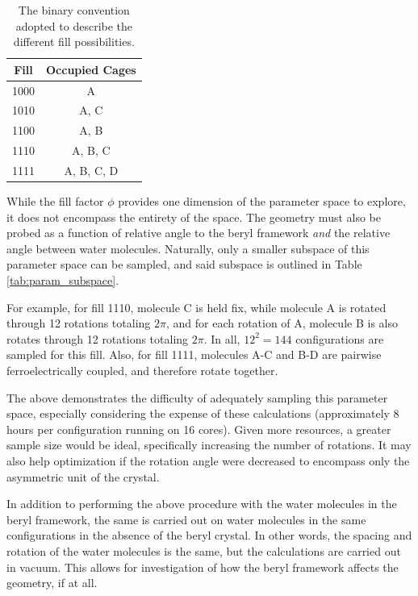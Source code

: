         \begin{table}[]
            \centering
            \begin{tabular}{c|c}
               Fill  & Occupied Cages \\
               \hline
               \hline
               1000  &  A \\
               1010  &  A, C \\
               1100  &  A, B \\
               1110  &  A, B, C \\
               1111  &  A, B, C, D\\
            \end{tabular}
            \caption{The binary convention adopted to describe the different fill possibilities.}
            \label{tab:fill_conventions}
        \end{table}
        
        While the fill factor $\phi$ provides one dimension of the parameter space to explore, it does not encompass the entirety of the space. The geometry must also be probed as a function of relative angle to the beryl framework \textit{and} the relative angle between water molecules. Naturally, only a smaller subspace of this parameter space can be sampled, and said subspace is outlined in Table \ref{tab:param_subspace}.
        
        For example, for fill 1110, molecule C is held fix, while molecule A is rotated through 12 rotations totaling $2\pi$, and for each rotation of A, molecule B is also rotates through 12 rotations totaling $2\pi$. In all, $12^2 = 144$ configurations are sampled for this fill. Also, for fill 1111, molecules A-C and B-D are pairwise ferroelectrically coupled, and therefore rotate together. 
        
        The above demonstrates the difficulty of adequately sampling this parameter space, especially considering the expense of these calculations (approximately 8 hours per configuration running on 16 cores). Given more resources, a greater sample size would be ideal, specifically increasing the number of rotations. It may also help optimization if the rotation angle were decreased to encompass only the asymmetric unit of the crystal.
        
        In addition to performing the above procedure with the water molecules in the beryl framework, the same is carried out on water molecules in the same configurations in the absence of the beryl crystal. In other words, the spacing and rotation of the water molecules is the same, but the calculations are carried out in vacuum. This allows for investigation of how the beryl framework affects the geometry, if at all.
        
